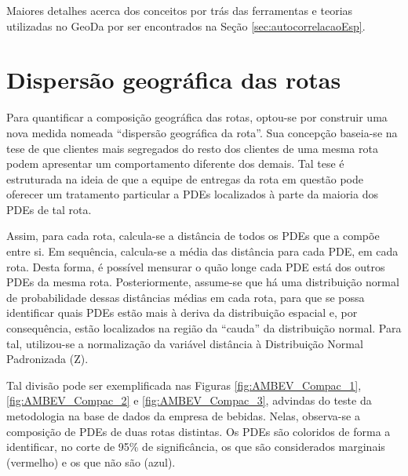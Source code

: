 Maiores detalhes acerca dos conceitos por trás das ferramentas e teorias utilizadas no GeoDa por ser encontrados na Seção \ref{sec:autocorrelacaoEsp}.

\section{Dispersão geográfica das rotas} \label{sec:dispGeoRotas}

Para quantificar a composição geográfica das rotas, optou-se por construir uma nova medida nomeada ``dispersão geográfica da rota''. 
Sua concepção baseia-se na tese de que clientes mais segregados do resto dos clientes de uma mesma rota podem apresentar um comportamento diferente dos demais. 
Tal tese é estruturada na ideia de que a equipe de entregas da rota em questão pode oferecer um tratamento particular a PDEs localizados à parte da maioria dos PDEs de tal rota.

Assim, para cada rota, calcula-se a distância de todos os PDEs que a compõe entre si. 
Em sequência, calcula-se a média das distância para cada PDE, em cada rota.
Desta forma, é possível mensurar o quão longe cada PDE está dos outros PDEs da mesma rota.
Posteriormente, assume-se que há uma distribuição normal de probabilidade dessas distâncias médias em cada rota, para que se possa identificar quais PDEs estão mais à deriva da distribuição espacial e, por consequência, estão localizados na região da ``cauda'' da distribuição normal. 
Para tal, utilizou-se a normalização da variável distância à Distribuição Normal Padronizada (Z). 

Tal divisão pode ser exemplificada nas Figuras \ref{fig:AMBEV_Compac_1}, \ref{fig:AMBEV_Compac_2} e \ref{fig:AMBEV_Compac_3}, advindas do teste da metodologia na base de dados da empresa de bebidas.
Nelas, observa-se a composição de PDEs de duas rotas distintas.
Os PDEs são coloridos de forma a identificar, no corte de 95\% de significância, os que são considerados marginais (vermelho) e os que não são (azul). 


